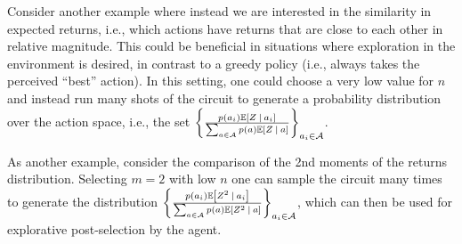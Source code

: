 \documentclass{article}
\DeclarePairedDelimiter{\abs}{\lvert}{\rvert} %
\DeclarePairedDelimiter{\bparen}{[}{]} %
\DeclarePairedDelimiter{\set}{\{}{\}} %
\newcommand{\E}{\mathbb{E}} %
\newcommand{\bfunc}[2]{#1\bparen*{#2}} %
\newcommand{\given}[1][]{\:#1\vert\:}
\begin{document}
Consider another example where instead we are interested in the similarity in expected returns, i.e., which actions have returns that are close to each other in relative magnitude. This could be beneficial in situations where exploration in the environment is desired, in contrast to a greedy policy (i.e., always takes the perceived ``best'' action). In this setting, one could choose a very low value for $n$ and instead run many shots of the circuit to generate a probability distribution over the action space, i.e., the set $\set*{\frac{p(a_i)\bfunc{\mathbb{E}}{Z \given a_i}}{\sum_{a \in \mathcal{A}} p(a)\bfunc{\mathbb{E}}{Z \given a}}}_{a_i \in \mathcal{A}}$.

As another example, consider the comparison of the 2nd moments of the returns distribution. Selecting $m=2$ with low $n$ one can sample the circuit many times to generate the distribution $\set*{\frac{p(a_i)\bfunc{\mathbb{E}}{Z^{2} \given a_i}}{\sum_{a \in \mathcal{A}} p(a)\bfunc{\mathbb{E}}{Z^{2} \given a}}}_{a_i \in \mathcal{A}}$, which can then be used for explorative post-selection by the agent.






% 
% 
\printbibliography
\end{document}
